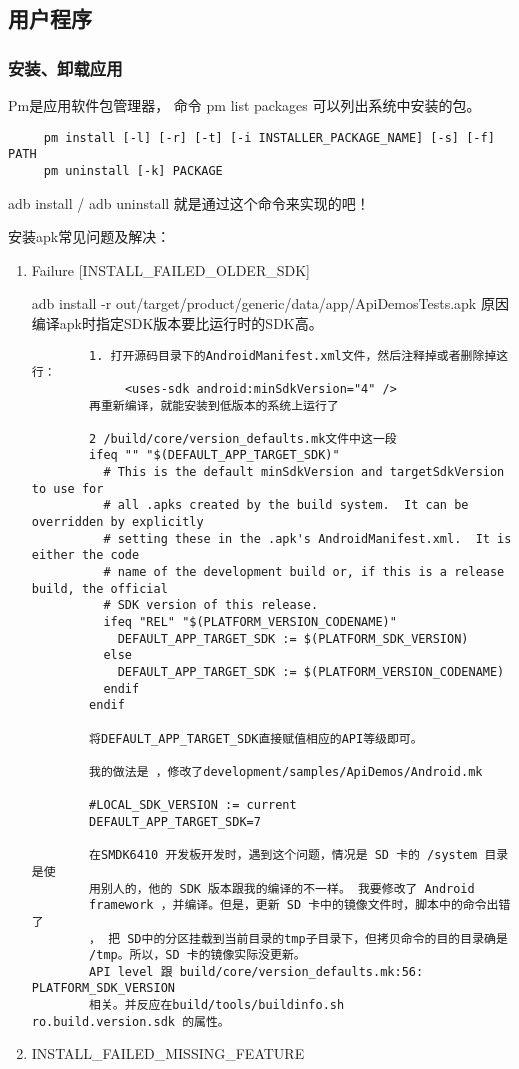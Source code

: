 \documentclass[a4paper,titlepage]{article}
\begin{document}
\subsection{用户程序}
\subsubsection{安装、卸载应用}
Pm是应用软件包管理器， 命令 pm list packages 可以列出系统中安装的包。
\begin{lstlisting}
     pm install [-l] [-r] [-t] [-i INSTALLER_PACKAGE_NAME] [-s] [-f] PATH 
     pm uninstall [-k] PACKAGE
 \end{lstlisting}
adb install / adb  uninstall 就是通过这个命令来实现的吧！

安装apk常见问题及解决：
\begin{enumerate}
    \item Failure [INSTALL_FAILED_OLDER_SDK]

        adb install -r out/target/product/generic/data/app/ApiDemosTests.apk
        原因编译apk时指定SDK版本要比运行时的SDK高。
        \begin{verbatim}
        1. 打开源码目录下的AndroidManifest.xml文件，然后注释掉或者删除掉这行：
             <uses-sdk android:minSdkVersion="4" />
        再重新编译，就能安装到低版本的系统上运行了

        2 /build/core/version_defaults.mk文件中这一段
        ifeq "" "$(DEFAULT_APP_TARGET_SDK)"
          # This is the default minSdkVersion and targetSdkVersion to use for
          # all .apks created by the build system.  It can be overridden by explicitly
          # setting these in the .apk's AndroidManifest.xml.  It is either the code
          # name of the development build or, if this is a release build, the official
          # SDK version of this release.
          ifeq "REL" "$(PLATFORM_VERSION_CODENAME)"
            DEFAULT_APP_TARGET_SDK := $(PLATFORM_SDK_VERSION)
          else
            DEFAULT_APP_TARGET_SDK := $(PLATFORM_VERSION_CODENAME)
          endif
        endif

        将DEFAULT_APP_TARGET_SDK直接赋值相应的API等级即可。

        我的做法是 ，修改了development/samples/ApiDemos/Android.mk

        #LOCAL_SDK_VERSION := current
        DEFAULT_APP_TARGET_SDK=7

        在SMDK6410 开发板开发时，遇到这个问题，情况是 SD 卡的 /system 目录是使
        用别人的，他的 SDK 版本跟我的编译的不一样。 我要修改了 Android
        framework ，并编译。但是，更新 SD 卡中的镜像文件时，脚本中的命令出错了
        ， 把 SD中的分区挂载到当前目录的tmp子目录下，但拷贝命令的目的目录确是
        /tmp。所以，SD 卡的镜像实际没更新。
        API level 跟 build/core/version_defaults.mk:56:  PLATFORM_SDK_VERSION
        相关。并反应在build/tools/buildinfo.sh    ro.build.version.sdk 的属性。
        \end{verbatim}
    \item INSTALL_FAILED_MISSING_FEATURE


\end{enumerate}
\end{document}
